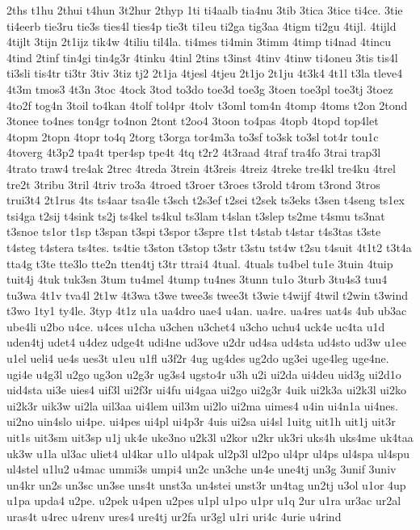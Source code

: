 {2ths
t1hu
2thui
t4hun
3t2hur
2thyp
1ti
ti4aalb
tia4nu
3tib
3tica
3tice
ti4ce.
3tie
ti4eerb
tie3ru
tie3s
ties4l
ties4p
tie3t
ti1eu
ti2ga
tig3aa
4tigm
ti2gu
4tijl.
4tijld
4tijlt
3tijn
2t1ijz
tik4w
4tiliu
til4la.
ti4mes
ti4min
3timm
4timp
ti4nad
4tincu
4tind
2tinf
tin4gi
tin4g3r
4tinku
4tinl
2tins
t3inst
4tinv
4tinw
ti4oneu
3tis
tis4l
ti3sli
tis4tr
ti3tr
3tiv
3tiz
tj2
2t1ja
4tjesl
4tjeu
2t1jo
2t1ju
4t3k4
4t1l
t3la
tleve4
4t3m
tmos3
4t3n
3toc
4tock
3tod
to3do
toe3d
toe3g
3toen
toe3pl
toe3tj
3toez
4to2f
tog4n
3toil
to4kan
4tolf
tol4pr
4tolv
t3oml
tom4n
4tomp
4toms
t2on
2tond
3tonee
to4nes
ton4gr
to4non
2tont
t2oo4
3toon
to4pas
4topb
4topd
top4let
4topm
2topn
4topr
to4q
2torg
t3orga
tor4m3a
to3sf
to3sk
to3sl
tot4r
tou1c
4toverg
4t3p2
tpa4t
tper4sp
tpe4t
4tq
t2r2
4t3raad
4traf
tra4fo
3trai
trap3l
4trato
traw4
tre4ak
2trec
4treda
3trein
4t3reis
4treiz
4treke
tre4kl
tre4ku
4trel
tre2t
3tribu
3tril
4triv
tro3a
4troed
t3roer
t3roes
t3rold
t4rom
t3rond
3tros
trui3t4
2t1rus
4ts
ts4aar
tsa4le
t3sch
t2s3ef
t2sei
t2sek
ts3eks
t3sen
t4seng
ts1ex
tsi4ga
t2sij
t4sink
ts2j
ts4kel
ts4kul
ts3lam
t4slan
t3slep
ts2me
t4smu
ts3nat
t3snoe
ts1or
t1sp
t3span
t3spi
t3spor
t3spre
t1st
t4stab
t4star
t4s3tas
t3ste
t4steg
t4stera
ts4tes.
ts4tie
t3ston
t3stop
t3str
t3stu
tst4w
t2su
t4suit
4t1t2
t3t4a
tta4g
t3te
tte3lo
tte2n
tten4tj
t3tr
ttrai4
4tual.
4tuals
tu4bel
tu1e
3tuin
4tuip
tuit4j
4tuk
tuk3sn
3tum
tu4mel
4tump
tu4nes
3tunn
tu1o
3turb
3tu4s3
tuu4
tu3wa
4t1v
tva4l
2t1w
4t3wa
t3we
twee3s
twee3t
t3wie
t4wijf
4twil
t2win
t3wind
t3wo
1ty1
ty4le.
3typ
4t1z
u1a
ua4dro
uae4
u4an.
ua4re.
ua4res
uat4s
4ub
ub3ac
ube4li
u2bo
u4ce.
u4ces
u1cha
u3chen
u3chet4
u3cho
uchu4
uck4e
uc4ta
u1d
uden4tj
udet4
u4dez
udge4t
udi4ne
ud3ove
u2dr
ud4sa
ud4sta
ud4sto
ud3w
u1ee
u1el
ueli4
ue4s
ues3t
u1eu
u1fl
u3f2r
4ug
ug4des
ug2do
ug3ei
uge4leg
uge4ne.
ugi4e
u4g3l
u2go
ug3on
u2g3r
ug3s4
ugsto4r
u3h
u2i
ui2da
ui4deu
uid3g
ui2d1o
uid4sta
ui3e
uies4
uif3l
ui2f3r
ui4fu
ui4gaa
ui2go
ui2g3r
4uik
ui2k3a
ui2k3l
ui2ko
ui2k3r
uik3w
ui2la
uil3aa
ui4lem
uil3m
ui2lo
ui2ma
uimes4
u4in
ui4n1a
ui4nes.
ui2no
uin4slo
ui4pe.
ui4pes
ui4pl
ui4p3r
4uis
ui2sa
ui4sl
1uitg
uit1h
uit1j
uit3r
uit1s
uit3sm
uit3sp
u1j
uk4e
uke3no
u2k3l
u2kor
u2kr
uk3ri
uks4h
uks4me
uk4taa
uk3w
u1la
ul3ac
uliet4
ul4kar
u1lo
ul4pak
ul2p3l
ul2po
ul4pr
ul4ps
ul4spa
ul4spu
ul4stel
u1lu2
u4mac
ummi3s
umpi4
un2c
un3che
un4e
une4tj
un3g
3unif
3univ
un4kr
un2s
un3sc
un3se
uns4t
unst3a
un4stei
unst3r
un4tag
un2tj
u3ol
u1or
4up
u1pa
upda4
u2pe.
u2pek
u4pen
u2pes
u1pl
u1po
u1pr
u1q
2ur
u1ra
ur3ac
ur2al
uras4t
u4rec
u4renv
ures4
ure4tj
ur2fa
ur3gl
u1ri
uri4c
4urie
u4rind
}
